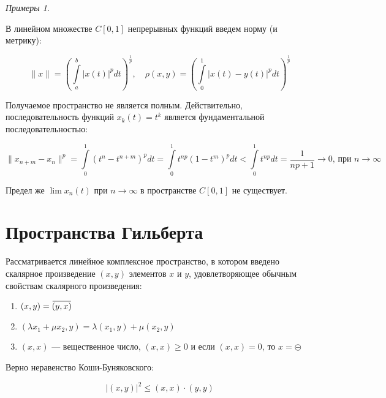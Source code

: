 \documentclass[12pt,a4paper,titlepage,oneside]{book}
\newcommand{\overbar}[1]{\mkern 1.5mu\overline{\mkern-1.5mu#1\mkern-1.5mu}\mkern 1.5mu}
\theoremstyle{definition}
\theoremstyle{plain}
\theoremstyle{remark}
\theoremstyle{remark}
\theoremstyle{remark}
\newtheorem*{examples}{Примеры}
\theoremstyle{remark}
\theoremstyle{plain}
\theoremstyle{plain}
\begin{document}
\begin{examples}
\begin{enumerate}
	В линейном множестве $C[0,1]$ непрерывных функций введем норму (и метрику):

	\begin{equation*}
	\lVert x\rVert = (\int\limits_a^b\lvert x(t)\rvert^pdt)^{\frac{1}{p}},\quad\rho(x,y) = (\int\limits_0^1\lvert x(t)-y(t)\rvert^pdt)^{\frac{1}{p}}
	\end{equation*}

	Получаемое пространство не является полным. Действительно, последовательность функций $x_k(t)=t^k$ является фундаментальной последовательностью:

	\begin{equation*}
	\lVert x_{n+m}-x_n\rVert^p=\int\limits_0^1(t^n-t^{n+m})^pdt=\int\limits_0^1t^{np}(1-t^m)^pdt<\int\limits_0^1t^{np}dt=\frac{1}{np+1}\to0 \mbox{, при } n \to\infty
	\end{equation*}

	Предел же $\lim x_n(t)$ при $n\to\infty$ в пространстве $C[0,1]$ не существует.

\end{enumerate}

\end{examples}

\section{Пространства Гильберта}

Рассматривается линейное комплексное пространство, в котором введено скалярное произведение $(x, y)$ элементов $x$ и $y$, удовлетворяющее обычным свойствам скалярного произведения:

\begin{enumerate}

    \item $(x, y) = \overbar{(y, x)}$

    \item $(\lambda x_1 + \mu x_2, y) = \lambda (x_1, y) + \mu (x_2, y)$

    \item $(x, x)$ --- вещественное число, $(x, x) \geqslant 0$ и если $(x, x) = 0$, то $x = \circleddash$

\end{enumerate}

Верно неравенство Коши-Буняковского:

\begin{equation*}
\lvert (x, y) \rvert ^2 \le (x, x) \cdot (y, y)
\end{equation*}
\end{document}
